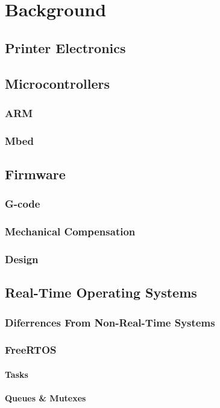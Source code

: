 \chapter{Background}
	
	\label{sec:background}
	
	\section{Printer Electronics}
	
	\section{Microcontrollers}
		
		\subsection{ARM}
		
		\subsection{Mbed}
		
	\section{Firmware}
		
		\subsection{G-code}
		
		\subsection{Mechanical Compensation}
		
		\subsection{Design}
	
	\section{Real-Time Operating Systems}
		
		\subsection{Diferrences From Non-Real-Time Systems}
		
		\subsection{FreeRTOS}
		
			\subsubsection{Tasks}
			
			\subsubsection{Queues \& Mutexes}
